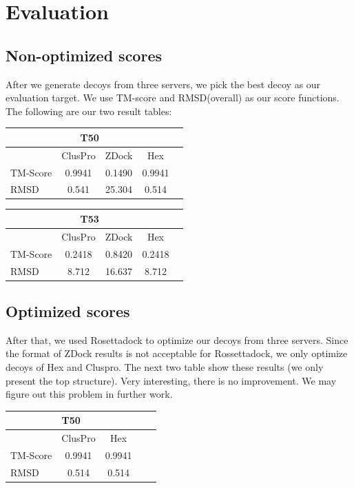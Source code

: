 \documentclass{article}
\begin{document}
\section{Evaluation}

\subsection{Non-optimized scores}

After we generate decoys from three servers, we pick the best decoy as our evaluation target. We use TM-score and RMSD(overall) as our score functions. The following are our two result tables:

\begin{center}
\begin{tabular}{|l|c|c|c|r|}
\multicolumn{4}{c}{T50} \\
    \hline
      & ClusPro & ZDock & Hex \\ \hline
    TM-Score & 0.9941 & 0.1490 & 0.9941 \\ \hline
    RMSD & 0.541 & 25.304 & 0.514 \\
    \hline
    \end{tabular}
\end{center}

\begin{center}
\begin{tabular}{|l|c|c|c|r|}
\multicolumn{4}{c}{T53} \\
    \hline
      & ClusPro & ZDock & Hex \\ \hline
    TM-Score & 0.2418 & 0.8420 & 0.2418 \\ \hline
    RMSD & 8.712 & 16.637 & 8.712 \\
    \hline
    \end{tabular}
\end{center}


\subsection{Optimized scores}

After that, we used Rosettadock to optimize our decoys from three servers. Since the format of ZDock results is not acceptable for Rossettadock, we only optimize decoys of Hex and Cluspro. The next two table show these results (we only present the top structure). Very interesting, there is no improvement. We may figure out this problem in further work.

\begin{center}
\begin{tabular}{|l|c|c|c|r|}
\multicolumn{3}{c}{T50} \\
    \hline
      & ClusPro & Hex \\ \hline
    TM-Score & 0.9941 & 0.9941 \\ \hline
    RMSD & 0.514 & 0.514 \\
    \hline
    \end{tabular}
\end{center}
\end{document}
